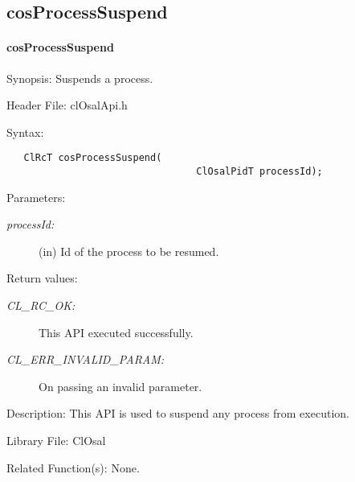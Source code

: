 \newpage
\subsection{cosProcessSuspend}
\hypertarget{pageosal141}{}\paragraph{cos\-Process\-Suspend}\label{pageosal141}
\begin{Desc}
\item[Synopsis:]Suspends a process.\end{Desc}
\begin{Desc}
\item[Header File:]clOsalApi.h\end{Desc}
\begin{Desc}
\item[Syntax:]

\footnotesize\begin{verbatim}   ClRcT cosProcessSuspend(
	                             ClOsalPidT processId);
\end{verbatim}
\normalsize
\end{Desc}
\begin{Desc}
\item[Parameters:]
\begin{description}
\item[{\em process\-Id:}](in) Id of the process to be resumed.
\end{description}
\end{Desc}
\begin{Desc}
\item[Return values:]
\begin{description}
\item[{\em CL\_\-RC\_\-OK:}]This API executed successfully. 
\item[{\em CL\_\-ERR\_\-INVALID\_\-PARAM:}]On passing an invalid parameter.

\end{description}
\end{Desc}
\begin{Desc}
\item[Description:]This API is used to suspend any process from execution.\end{Desc}
\begin{Desc}
\item[Library File:]Cl\-Osal\end{Desc}
\begin{Desc}
\item[Related Function(s):]None.\end{Desc}


